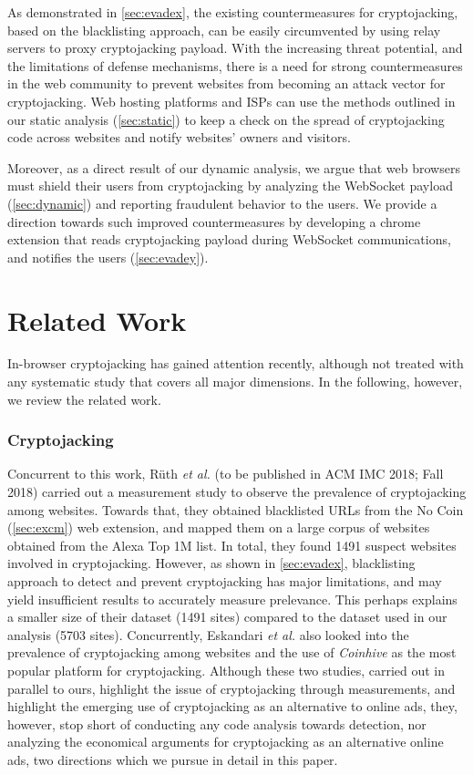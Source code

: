 \documentclass[acmlarge]{acmart}
\newcommand{\ch}{{\em Coinhive}\xspace}
\newcommand{\cc}{{cryptocurrency}\xspace}
\newcommand{\cj}{cryptojacking\xspace}
\newcommand{\etal}{{\em et al.}\xspace}
\begin{document}
As demonstrated in \textsection\ref{sec:evadex}, the existing countermeasures for \cj, based on the blacklisting approach, can be easily circumvented by using relay servers to proxy \cj payload. With the increasing threat potential, and the limitations of defense mechanisms, there is a need for strong countermeasures in the web community to prevent websites from becoming an attack vector for \cj. Web hosting platforms and ISPs can use the methods outlined in our static analysis (\textsection\ref{sec:static}) to keep a check on the spread of \cj code across websites and notify websites' owners and visitors. 

Moreover, as a direct result of our dynamic analysis, we argue that web browsers must shield their users from \cj by analyzing the WebSocket payload (\textsection\ref{sec:dynamic}) and reporting fraudulent behavior to the users. We provide a direction towards such improved countermeasures by developing a chrome extension that reads \cj payload during WebSocket communications, and notifies the users (\textsection\ref{sec:evadey}).


\section{Related Work} \label{sec:rw}
In-browser \cj has gained attention recently, although not treated with any systematic study that covers all major dimensions. In the following, however, we review the related work. %


\subsubsection*{Cryptojacking}
Concurrent to this work, R{\"u}th \etal \cite{RuthWH18} (to be published in ACM IMC 2018; Fall 2018) carried out a measurement study to observe the prevalence of \cj among websites. Towards that, they obtained blacklisted URLs from the No Coin (\textsection\ref{sec:excm}) web extension, and mapped them on a large corpus of websites obtained from the Alexa Top 1M list. In total, they found 1491 suspect websites involved in \cj. However, as shown in \textsection\ref{sec:evadex}, blacklisting approach to detect and prevent \cj has major limitations, and may yield insufficient results to accurately measure prelevance. This perhaps explains a smaller size of their dataset (1491 sites) compared to the dataset used in our analysis (5703 sites). Concurrently, Eskandari \etal \cite{EskandariLMC18} also looked into the prevalence of \cj among websites and the use of \ch as the most popular platform for \cj. Although these two studies, carried out in parallel to ours, highlight the issue of \cj  through measurements, and highlight the emerging use of \cj as an alternative to online ads, they, however, stop short of conducting any code analysis towards detection, nor analyzing the economical arguments for \cj as an alternative online ads, two directions which we pursue in detail in this paper.
\end{document}
